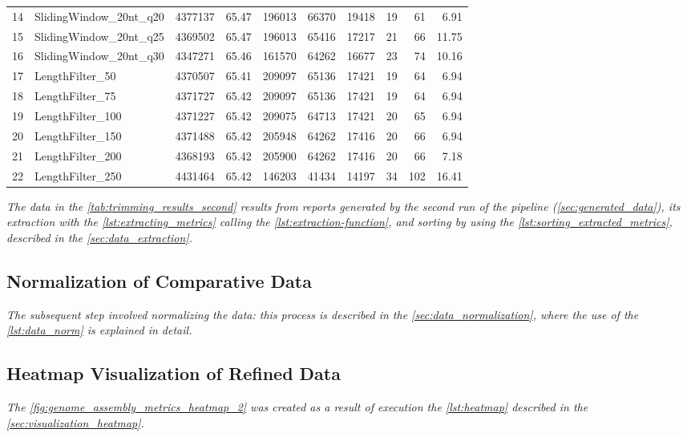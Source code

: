 \begin{table}[ht!]
{\begin{tabular}{|c|l|r|r|r|r|r|r|r|r|}
14 & SlidingWindow\_20nt\_q20 & 4377137 & 65.47 & 196013 & 66370 & 19418 & 19 & 61 & 6.91 \\
15 & SlidingWindow\_20nt\_q25 & 4369502 & 65.47 & 196013 & 65416 & 17217 & 21 & 66 & 11.75 \\
16 & SlidingWindow\_20nt\_q30 & 4347271 & 65.46 & 161570 & 64262 & 16677 & 23 & 74 & 10.16 \\
17 & LengthFilter\_50 & 4370507 & 65.41 & 209097 & 65136 & 17421 & 19 & 64 & 6.94 \\
18 & LengthFilter\_75 & 4371727 & 65.42 & 209097 & 65136 & 17421 & 19 & 64 & 6.94 \\
19 & LengthFilter\_100 & 4371227 & 65.42 & 209075 & 64713 & 17421 & 20 & 65 & 6.94 \\
20 & LengthFilter\_150 & 4371488 & 65.42 & 205948 & 64262 & 17416 & 20 & 66 & 6.94 \\
21 & LengthFilter\_200 & 4368193 & 65.42 & 205900 & 64262 & 17416 & 20 & 66 & 7.18 \\
22 & LengthFilter\_250 & 4431464 & 65.42 & 146203 & 41434 & 14197 & 34 & 102 & 16.41 \\
\hline
\end{tabular}%
}
\end{table}


\textit{The data in the \autoref{tab:trimming_results_second} results from reports generated by the second run of the pipeline (\autoref{sec:generated_data}), its extraction with the \autoref{lst:extracting_metrics} calling the \autoref{lst:extraction-function}, and sorting by using the \autoref{lst:sorting_extracted_metrics}, described in the  \autoref{sec:data_extraction}.}

\subsection{Normalization of Comparative Data}

\textit{The subsequent step involved normalizing the data: this process is described in the \autoref{sec:data_normalization}, where the use of the \autoref{lst:data_norm} is explained in detail.}

\subsection{Heatmap Visualization of Refined Data}

\textit{The \autoref{fig:genome_assembly_metrics_heatmap_2} was created as a result of execution the \autoref{lst:heatmap} described in the  \autoref{sec:visualization_heatmap}.}

